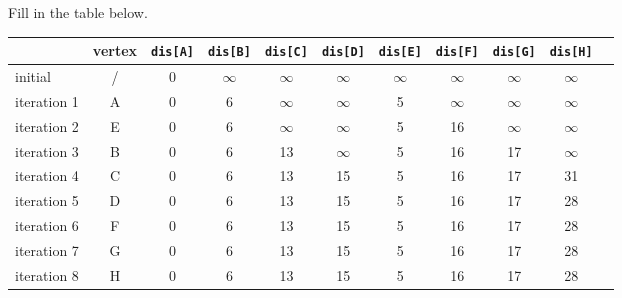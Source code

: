 Fill in the table below.
\begin{table}[htbp]
    \begin{center}  
        \begin{tabular}{|l|c|c|c|c|c|c|c|c|c| p{3cm}|}  
            \hline  
            & vertex & \texttt{dis[A]} & \texttt{dis[B]} & \texttt{dis[C]} & \texttt{dis[D]} & \texttt{dis[E]} & \texttt{dis[F]} & \texttt{dis[G]} & \texttt{dis[H]}\\ \hline  
            initial 	& / & 0 &$\infty$&$\infty$&$\infty$&$\infty$&$\infty$&$\infty$&$\infty$\\ \hline
            iteration 1 & A  & 0  & 6  & $\infty$  & $\infty$  & 5  & $\infty$  &  $\infty$ & $\infty$ \\ \hline    
            iteration 2 & E  & 0  & 6  & $\infty$  & $\infty$  & 5  & 16  & $\infty$  & $\infty$ \\ \hline    
            iteration 3 & B  & 0  & 6  & 13  & $\infty$  & 5  & 16  &  17 & $\infty$ \\ \hline    
            iteration 4 & C  & 0  & 6  & 13  & 15  & 5  & 16  & 17 & 31 \\ \hline    
            iteration 5 & D  & 0  & 6  & 13  & 15  & 5  & 16  & 17  & 28 \\ \hline   
            iteration 6 & F  & 0  & 6  & 13  & 15  & 5  & 16  & 17  & 28 \\ \hline    
            iteration 7 & G  & 0  & 6  & 13  & 15  & 5  & 16  & 17  & 28 \\ \hline   
            iteration 8 & H  & 0  & 6  & 13  & 15  & 5  & 16  & 17  & 28 \\  
            \hline  
        \end{tabular}  
    \end{center}  
\end{table}
